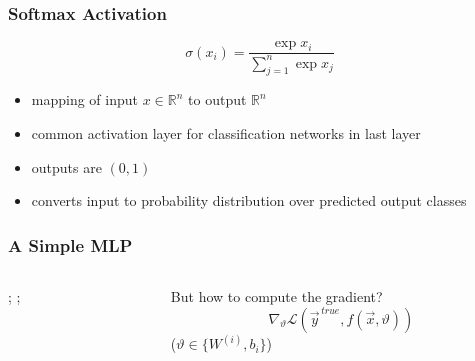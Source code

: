 \documentclass[
  aspectratio=1610, %
  intlimits %
]{beamer}
\begin{document}
 \begin{frame}
 \frametitle{Softmax Activation}
 \begin{equation*}
\sigma(x_i) = \frac{\exp{x_i}}{\sum_{j=1}^{n} \exp{x_j}}
\end{equation*}
\begin{itemize}
\item mapping of input $x \in \mathbb{R}^n$ to output $\mathbb{R}^n$
\item common activation layer for classification networks in last layer
\item outputs are $(0,1)$
\item converts input to probability distribution over predicted output classes
\end{itemize}
\end{frame}

\renewcommand{\inText}[1]{
 $I_{#1}$
}
\renewcommand{\hidText}[1]{
 {$F_{relu}(H_{#1})$}%
}
\renewcommand{\outText}[1]{
 $F_{smax}(O_{#1})$%
}
\renewcommand{\synapseIHText}[2]{%
 {\ifthenelse{\equal{#1}{1}}{}{\small$W^{(I)}_{#1#2}$}}}
\renewcommand{\synapseHOText}[2]{\small$W^{(H)}_{#1#2}$}

 \begin{frame}
 \frametitle{A Simple MLP}

 \begin{columns}
   \begin{column}{.7\textwidth}
     {;
       ;
     }
   \end{column}
   \begin{column}{.28\textwidth}
     
     \begin{exampleblock}{But how to compute the gradient?}
       \vspace{-1em}
       \Large
       \begin{equation*}
         \nabla_{\vartheta}\mathcal{L} ( \vec{y}^{\,true}, f(\vec{x}, \vartheta) )
       \end{equation*}
       \small
       \centering
     ($\vartheta \in \{W^{(i)}, b_i\}$)
   \end{exampleblock}
     
   \end{column}
 \end{columns}
 
\end{frame}
\end{document}
